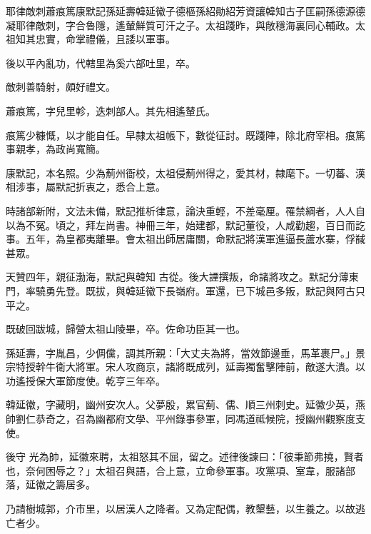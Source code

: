 
\begin{pinyinscope}

 耶律敵刺蕭痕篤康默記孫延壽韓延徽子德樞孫紹勛紹芳資讓韓知古子匡嗣孫德源德凝耶律敵刺，字合魯隱，遙輦鮮質可汗之子。太祖踐昨，與敞穩海裏同心輔政。太祖知其忠實，命掌禮儀，且諉以軍事。



 後以平內亂功，代轄里為奚六部吐里，卒。



 敵刺善騎射，頗好禮文。



 蕭痕篤，字兒里軫，迭刺部人。其先相遙輦氏。



 痕篤少糠慨，以才能自任。早隸太祖帳下，數從征討。既踐陣，除北府宰相。痕篤事親孝，為政尚寬簡。



 康默記，本名照。少為薊州衙校，太祖侵薊州得之，愛其材，隸麾下。一切蕃、漢相涉事，屬默記折衷之，悉合上意。



 時諸部新附，文法未備，默記推析律意，論決重輕，不差毫厘。罹禁綱者，人人自以為不冤。頃之，拜左尚書。神冊三年，始建都，默記董役，人咸勸趨，百日而訖事。五年，為皇都夷離畢。會太祖出師居庸關，命默記將漢軍進逼長蘆水寨，俘馘甚眾。



 天贊四年，親征渤海，默記與韓知
 古從。後大諲撰叛，命諸將攻之。默記分薄東門，率驍勇先登。既拔，與韓延徽下長嶺府。軍還，已下城邑多叛，默記與阿古只平之。



 既破回跋城，歸營太祖山陵畢，卒。佐命功臣其一也。



 孫延壽，字胤昌，少倜儻，調其所親：「大丈夫為將，當效節邊垂，馬革裹尸。」景宗特授幹牛衛大將軍。宋人攻商京，諸將既成列，延壽獨奮擊陣前，敵遂大潰。以功遙授保大軍節度使。乾亨三年卒。



 韓延徽，字藏明，幽州安次人。父夢殷，累官薊、儒、順三州刺史。延徽少英，燕帥劉仁恭奇之，召為幽都府文學、平州錄事參軍，同馮道祗候院，授幽州觀察度支使。



 後守
 光為帥，延徽來聘，太祖怒其不屈，留之。述律後諫曰：「彼秉節弗撓，賢者也，奈何困辱之？」太祖召與語，合上意，立命參軍事。攻黨項、室韋，服諸部落，延徽之籌居多。



 乃請樹城郭，介市里，以居漢人之降者。又為定配偶，教墾藝，以生養之。以故逃亡者少。




\end{pinyinscope}
